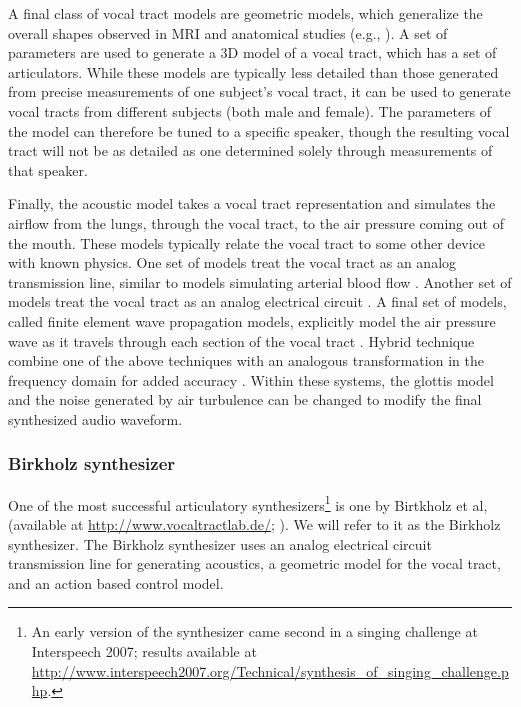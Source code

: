 \documentclass{article}
\begin{document}
A final class of vocal tract models
are geometric models,
which generalize the overall
shapes observed in
MRI and anatomical studies
(e.g., \citep{mermelstein1973}).
A set of parameters
are used to generate a 3D model
of a vocal tract,
which has a set of articulators.
While these models are typically
less detailed than those
generated from precise
measurements of one subject's vocal tract,
it can be used to generate vocal tracts
from different subjects
(both male and female).
The parameters of the model
can therefore be tuned to a specific speaker,
though the resulting vocal tract
will not be as detailed
as one determined solely through
measurements of that speaker.

Finally, the acoustic model takes
a vocal tract representation
and simulates the airflow from
the lungs, through the vocal tract,
to the air pressure coming out of the mouth.
These models typically relate
the vocal tract to some other
device with known physics.
One set of models treat the vocal tract
as an analog transmission line,
similar to models simulating
arterial blood flow \citep{meyer1989}.
Another set of models treat the vocal tract
as an analog electrical circuit
\citep{maeda1982}.
A final set of models,
called finite element wave propagation models,
explicitly model the air pressure wave
as it travels through each section
of the vocal tract \citep{elmasri1996}.
Hybrid technique combine one
of the above techniques
with an analogous transformation
in the frequency domain for added accuracy
\citep{sondhi1987}.
Within these systems, the glottis model
and the noise generated
by air turbulence can be changed
to modify the final synthesized audio waveform.

\subsubsection{Birkholz synthesizer}
\label{subsec:birkholz}

One of the most successful articulatory
synthesizers\footnote{An early version of the synthesizer
  came second in a singing challenge
  at Interspeech 2007; results available at
  \url{http://www.interspeech2007.org/Technical/synthesis_of_singing_challenge.php}.}
is one by Birtkholz et al,
(available at \url{http://www.vocaltractlab.de/};
\citealp{birkholz2013}).
We will refer to it as the Birkholz synthesizer.
The Birkholz synthesizer uses
an analog electrical circuit transmission line
for generating acoustics,
a geometric model for the vocal tract,
and an action based control model.
\end{document}
